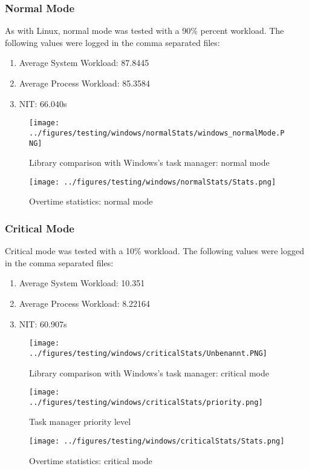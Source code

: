 \subsubsection{Normal Mode}
As with Linux, normal mode was tested with a 90\% percent workload. The following values were logged in the comma separated files:
\begin{enumerate}
	\item Average System Workload: 87.8445
	\item Average Process Workload: 85.3584
	\item NIT: 66.040s
\end{enumerate}
\begin{figure}[!htbp]
	\centering
	\begin{minipage}[b]{\textwidth}
		\centering
		\texttt{[image: ../figures/testing/windows/normalStats/windows\_normalMode.PNG]}
		\caption{Library comparison with Windows's task manager: normal mode}
		\hspace{3mm}
	\end{minipage}
	\begin{minipage}[b]{\textwidth}
		\centering
		\texttt{[image: ../figures/testing/windows/normalStats/Stats.png]}
		\caption{Overtime statistics: normal mode}
	\end{minipage}
\end{figure}


\newpage
\subsubsection{Critical Mode}
Critical mode was tested with a 10\% workload. The following values were logged in the comma separated files:
\begin{enumerate}
	\item Average System Workload: 10.351
	\item Average Process Workload: 8.22164
	\item NIT: 60.907s 
\end{enumerate}
\begin{figure}[!htbp]
	\centering
	\begin{minipage}[b]{\textwidth}
		\centering
		\texttt{[image: ../figures/testing/windows/criticalStats/Unbenannt.PNG]}
		\caption{Library comparison with Windows's task manager: critical mode}
		\hspace{3mm}
	\end{minipage}
	\begin{minipage}[b]{\textwidth}
		\centering
		\texttt{[image: ../figures/testing/windows/criticalStats/priority.png]}
		\caption{Task manager priority level}
		\hspace{3mm}
	\end{minipage}
	\begin{minipage}[b]{\textwidth}
		\centering
		\texttt{[image: ../figures/testing/windows/criticalStats/Stats.png]}
		\caption{Overtime statistics: critical mode}
	\end{minipage}
\end{figure}